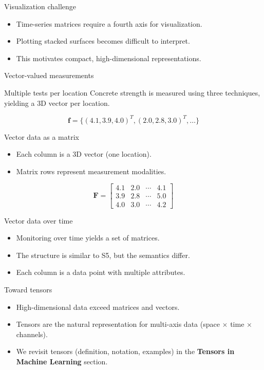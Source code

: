 \documentclass[12pt]{beamer}
\begin{document}
\begin{frame}{Visualization challenge}
  \begin{itemize}
    \item Time-series matrices require a fourth axis for visualization.
    \item Plotting stacked surfaces becomes difficult to interpret.
    \item This motivates compact, high-dimensional representations.
  \end{itemize}
\end{frame}

\begin{frame}{Vector-valued measurements}
  \begin{examplebox}{Multiple tests per location}
    Concrete strength is measured using three techniques, yielding a 3D vector per location.
  \end{examplebox}
  \[
  \bm{f} = \{ (4.1, 3.9, 4.0)^T, (2.0, 2.8, 3.0)^T, \ldots \}
  \]
\end{frame}

\begin{frame}{Vector data as a matrix}
  \begin{itemize}
    \item Each column is a 3D vector (one location).
    \item Matrix rows represent measurement modalities.
  \end{itemize}
  \[
  \bm{F} =
  \begin{bmatrix}
  4.1 & 2.0 & \cdots & 4.1 \\
  3.9 & 2.8 & \cdots & 5.0 \\
  4.0 & 3.0 & \cdots & 4.2
  \end{bmatrix}
  \]
\end{frame}

\begin{frame}{Vector data over time}
  \begin{itemize}
    \item Monitoring over time yields a set of matrices.
    \item The structure is similar to S5, but the semantics differ.
    \item Each column is a data point with multiple attributes.
  \end{itemize}
\end{frame}

\begin{frame}{Toward tensors}
  \begin{itemize}
    \item High-dimensional data exceed matrices and vectors.
    \item Tensors are the natural representation for multi-axis data (space $\times$ time $\times$ channels).
    \item We revisit tensors (definition, notation, examples) in the \textbf{Tensors in Machine Learning} section.
  \end{itemize}
\end{frame}
\end{document}
